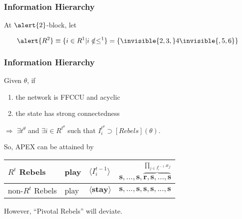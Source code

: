 \documentclass[10pt]{beamer}
\begin{document}
\begin{frame}
  \frametitle{Information Hierarchy}


\begin{center}
\end{center}

At $\alert{2}$-block, let

\[
\alert{R^{2}} \equiv \{i\in R^1|i\notin \leq^1\}=\{\invisible{2,3,}4\invisible{,5,6}\}
\]



\end{frame}





\begin{frame}
  \frametitle{Information Hierarchy}


\begin{theorem}
\label{lemma_empty}
Given $\theta$, if
\begin{enumerate}
\item the network is FFCCU and acyclic
\item the state has strong connectedness
\end{enumerate}
$\Rightarrow$ $\exists t^{\theta}$ and $\exists i\in R^{t^{\theta}}$ such that $I^{t^{\theta}}_i \supset [Rebels](\theta) $.
\end{theorem} 

So, APEX can be attained by

\begin{table}[h]
\begin{tabular}{l l l l}
$R^t$ Rebels & play & $\langle I^{t-1}_i\rangle$ & $\textbf{s},...,\textbf{s},\overbrace{\textbf{r},\textbf{s},...,\textbf{s}}^{\prod_{j\in I^{t-1}_i}x_j}$ \\
\hline
non-$R^t$ Rebels & play & $\langle \textbf{stay} \rangle$ & $\textbf{s},...,\textbf{s},\textbf{s},\textbf{s},...,\textbf{s}$  \\

\end{tabular}
\end{table}

\alert{However, ``Pivotal Rebels'' will deviate}.


\end{frame}
\end{document}
